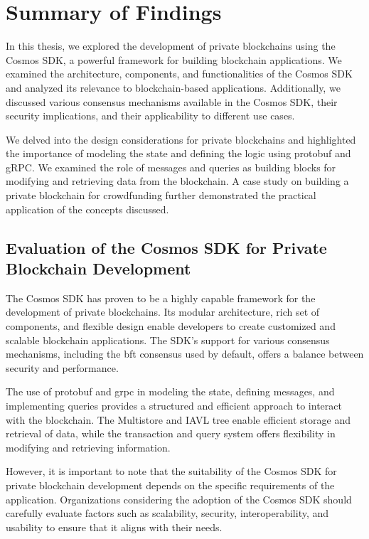 \chapter{Summary of Findings}
\label{ch:conclusion}

In this thesis, we explored the development of private blockchains using the Cosmos SDK, a powerful framework for building blockchain applications. We examined the architecture, components, and functionalities of the Cosmos SDK and analyzed its relevance to blockchain-based applications. Additionally, we discussed various consensus mechanisms available in the Cosmos SDK, their security implications, and their applicability to different use cases.

We delved into the design considerations for private blockchains and highlighted the importance of modeling the state and defining the logic using protobuf and gRPC. We examined the role of messages and queries as building blocks for modifying and retrieving data from the blockchain. A case study on building a private blockchain for crowdfunding further demonstrated the practical application of the concepts discussed.

\section{Evaluation of the Cosmos SDK for Private Blockchain Development}

The Cosmos SDK has proven to be a highly capable framework for the development of private blockchains. Its modular architecture, rich set of components, and flexible design enable developers to create customized and scalable blockchain applications. The SDK's support for various consensus mechanisms, including the \gls{bft} consensus used by default, offers a balance between security and performance.

The use of protobuf and \gls{grpc} in modeling the state, defining messages, and implementing queries provides a structured and efficient approach to interact with the blockchain. The Multistore and IAVL tree enable efficient storage and retrieval of data, while the transaction and query system offers flexibility in modifying and retrieving information.

However, it is important to note that the suitability of the Cosmos SDK for private blockchain development depends on the specific requirements of the application. Organizations considering the adoption of the Cosmos SDK should carefully evaluate factors such as scalability, security, interoperability, and usability to ensure that it aligns with their needs.

